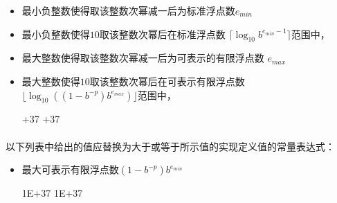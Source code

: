 \begin{itemize}
{    \[
      \begin{cases}
        \begin{tabular}{ll}
          $p\log_{10}b$ & $b$为$10$的幂次                                     \\
          $\lfloor (p - 1)\log_{10}b \rfloor$ & 否则
        \end{tabular}
      \end{cases}
    \]
    \begin{itemize}
    \end{itemize}}
  \item{最小负整数使得取该整数次幂减一后为标准浮点数$e_{min}$
    \begin{itemize}
    \end{itemize}}
  \item{最小负整数使得$10$取该整数次幂后在标准浮点数
    $\lceil \log_{10}b^{e_{min}-1}\rceil$范围中，
    \begin{itemize}
    \end{itemize}}
  \item{最大整数使得取该整数次幂减一后为可表示的有限浮点数
    $e_{max}$
    \begin{itemize}
    \end{itemize}}
  \item{最大整数使得$10$取该整数次幂后在可表示有限浮点数
      $\lfloor \log_{10}((1 - b^{-p})b^{e_{max}})\rfloor$范围中，
    \begin{itemize}
       {+37}
       {+37}
    \end{itemize}}
\end{itemize}

\paragraph{}
以下列表中给出的值应替换为大于或等于所示值的实现定义值的常量表达式：
\begin{itemize}
  \item{最大可表示有限浮点数$(1-b^{-p})b^{e_{min}}$
    \begin{itemize}
       {1E+37}
       {1E+37}
    \end{itemize}}
\end{itemize}

